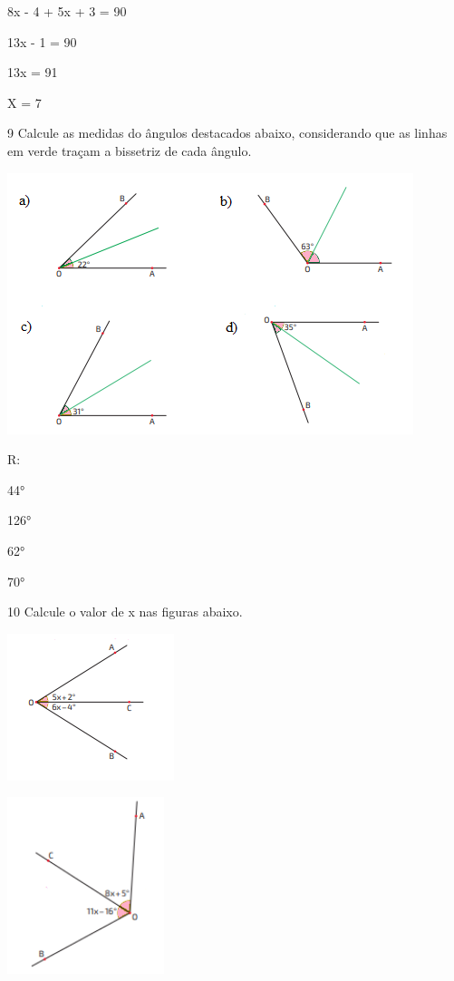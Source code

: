 {8x - 4 + 5x + 3 = 90

13x - 1 = 90

13x = 91

X = 7

\num{9} Calcule as medidas do ângulos destacados abaixo, considerando que as
linhas em verde traçam a bissetriz de cada ângulo.

\includegraphics[width=4.66667in,height=3in]{./imgSAEB_8_MAT/media/image32.png}

R:
\item 44°
\item 126°
\item 62°
\item 70°

\num{10} Calcule o valor de x nas figuras abaixo.
\item
\includegraphics[width=1.91667in,height=1.6875in]{./imgSAEB_8_MAT/media/image33.png}
\item
\includegraphics[width=1.80208in,height=2.02917in]{./imgSAEB_8_MAT/media/image34.png}

}
